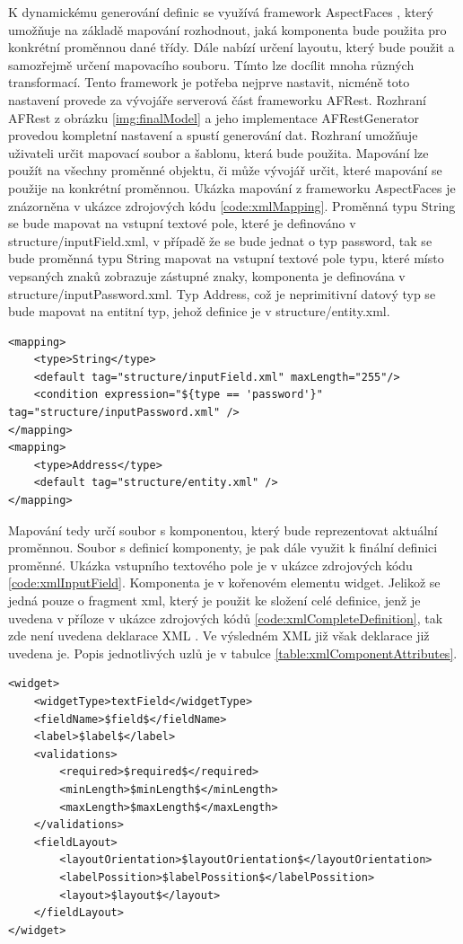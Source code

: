 K dynamickému generování definic se využívá framework AspectFaces \cite{aspectFaces}, který umožňuje na základě mapování rozhodnout, jaká komponenta bude použita pro konkrétní proměnnou dané třídy. Dále nabízí určení layoutu, který bude použit a samozřejmě určení mapovacího souboru. Tímto lze docílit mnoha různých transformací. Tento framework je potřeba nejprve nastavit, nicméně toto nastavení provede za vývojáře serverová část frameworku AFRest. Rozhraní AFRest z obrázku \ref{img:finalModel} a jeho implementace AFRestGenerator provedou kompletní nastavení a spustí generování dat. Rozhraní umožňuje uživateli určit mapovací soubor a šablonu, která bude použita. Mapování lze použít na všechny proměnné objektu, či může vývojář určit, které mapování se použije na konkrétní proměnnou. Ukázka mapování z frameworku AspectFaces je znázorněna v ukázce zdrojových kódu \ref{code:xmlMapping}. Proměnná typu String se bude mapovat na vstupní textové pole, které je definováno v structure/inputField.xml, v případě že se bude jednat o typ password, tak se bude proměnná typu String mapovat na vstupní textové pole typu, které místo vepsaných znaků zobrazuje zástupné znaky, komponenta je definována v structure/inputPassword.xml. Typ Address, což je neprimitivní datový typ se bude mapovat na entitní typ, jehož definice je v structure/entity.xml.
\begin{lstlisting}[caption=Ukázka mapování proměnných na komponenty,
label={code:xmlMapping}]
<mapping>
	<type>String</type>
	<default tag="structure/inputField.xml" maxLength="255"/>
	<condition expression="${type == 'password'}" tag="structure/inputPassword.xml" />
</mapping>
<mapping>
	<type>Address</type>
	<default tag="structure/entity.xml" />
</mapping>
\end{lstlisting}
Mapování tedy určí soubor s komponentou, který bude reprezentovat aktuální proměnnou. Soubor s definicí komponenty, je pak dále využit k finální definici proměnné. Ukázka vstupního textového pole je v ukázce zdrojových kódu \ref{code:xmlInputField}. Komponenta je v kořenovém elementu widget. Jelikož se jedná pouze o fragment xml, který je použit ke složení celé definice, jenž je uvedena v příloze v ukázce zdrojových kódů \ref{code:xmlCompleteDefinition}, tak zde není uvedena deklarace XML \cite{xml}. Ve výsledném XML již však deklarace již uvedena je. Popis jednotlivých uzlů je v tabulce \ref{table:xmlComponentAttributes}.
\begin{lstlisting}[caption=Ukázka definice komponenty,
label={code:xmlInputField}]
<widget>
	<widgetType>textField</widgetType>
	<fieldName>$field$</fieldName>
	<label>$label$</label>
	<validations>
		<required>$required$</required>
		<minLength>$minLength$</minLength>
		<maxLength>$maxLength$</maxLength>
	</validations>
	<fieldLayout>
		<layoutOrientation>$layoutOrientation$</layoutOrientation>
		<labelPossition>$labelPossition$</labelPossition>
		<layout>$layout$</layout>
	</fieldLayout>
</widget>
\end{lstlisting}
